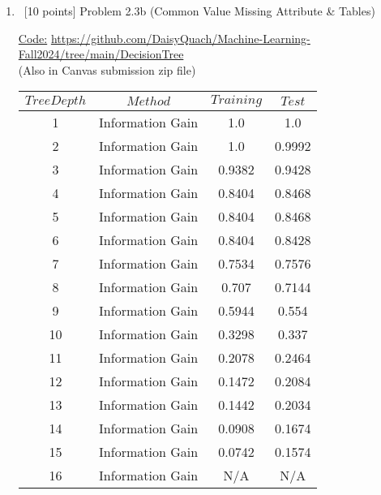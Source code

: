 \documentclass[8pt, fullpage,letterpaper]{article}
\begin{document}
\begin{enumerate}
\begin{enumerate}
\begin{center}
\begin{tabular}{c|c|c|c}
			\end{tabular}
		\end{center}


\color{black}
	\item~[10 points] Problem 2.3b (Common Value Missing Attribute \& Tables)


		\color{violet}

		\underline{Code:} \url{https://github.com/DaisyQuach/Machine-Learning-Fall2024/tree/main/DecisionTree}\\
		(Also in Canvas submission zip file)


		\begin{center}
			\begin{tabular}{c|c|c|c}
				\hline
				$Tree Depth$ & $Method$ & $Training $ & $Test $ \\ 
				\hline\hline\hline
				1 & Information Gain 		& 1.0 & 1.0  \\ \hline
				2 & Information Gain 		& 1.0 & 0.9992  \\ \hline
				3 & Information Gain 		& 0.9382 & 0.9428  \\ \hline
				4 & Information Gain 		& 0.8404 & 0.8468  \\ \hline
				5 & Information Gain 		& 0.8404 & 0.8468  \\ \hline
				6 & Information Gain 		& 0.8404 & 0.8428  \\ \hline
				7 & Information Gain 		& 0.7534 & 0.7576  \\ \hline
				8 & Information Gain 		& 0.707 & 0.7144  \\ \hline
				9 & Information Gain 		& 0.5944 & 0.554  \\ \hline
				10 & Information Gain 	& 0.3298 & 0.337  \\ \hline
				11 & Information Gain 	& 0.2078 & 0.2464  \\ \hline
				12 & Information Gain 	& 0.1472 & 0.2084  \\ \hline
				13 & Information Gain 	& 0.1442 & 0.2034  \\ \hline
				14 & Information Gain 	& 0.0908 & 0.1674  \\ \hline
				15 & Information Gain 	& 0.0742 & 0.1574  \\ \hline
				16 & Information Gain 	& N/A & N/A  \\ \hline\hline


\end{tabular}
\end{center}
\end{enumerate}
\end{enumerate}
\end{document}
